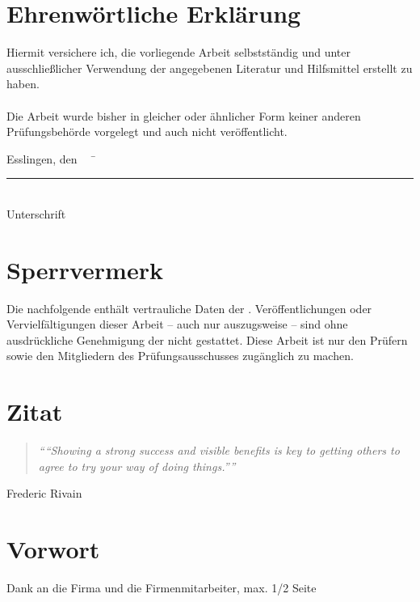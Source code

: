 \begin{spacing}{1.2}

\chapter*{Ehrenwörtliche Erklärung}

Hiermit versichere ich, die vorliegende Arbeit selbstständig und unter ausschließlicher Verwendung der angegebenen Literatur und Hilfsmittel erstellt zu haben.\\\\
Die Arbeit wurde bisher in gleicher oder ähnlicher Form keiner anderen Prüfungsbehörde vorgelegt und auch nicht veröffentlicht.\\
\begin{tabbing}
          Esslingen, den \workDatum ~~	\= \rule{5cm}{0.3mm}\\
                                                                                                    \> Unterschrift
\end{tabbing}
%
\newpage
%
\chapter*{Sperrvermerk} %

Die nachfolgende \workTyp enthält vertrauliche Daten der \workFirma.
Veröffentlichungen oder Vervielfältigungen dieser Arbeit -- auch nur auszugsweise -- sind ohne ausdrückliche Genehmigung der \workFirma nicht gestattet.
Diese Arbeit ist nur den Prüfern sowie den Mitgliedern des Prüfungsausschusses zugänglich zu machen.
\newpage
%
\chapter*{Zitat} %
\begin{center}
\begin{minipage}{12cm}
\begin{quotation}
\textit{\enquote{“Showing a strong success and visible benefits is key to getting others to agree to try your way of doing things.”}}
\end{quotation}
\hfill \textsf Frederic Rivain
\end{minipage}
\end{center}
\newpage{}
\chapter*{Vorwort} %

Dank an die Firma und die Firmenmitarbeiter, max. 1/2 Seite

\newpage

\end{spacing}